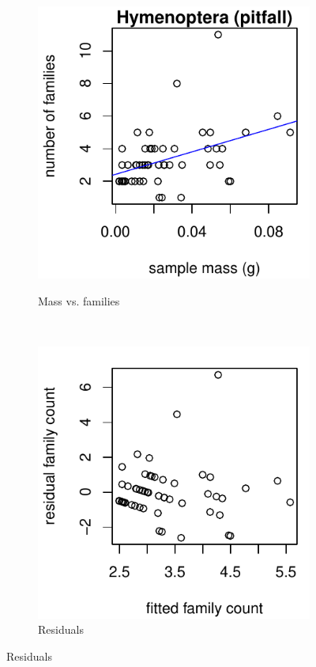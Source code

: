\documentclass[10pt,letterpaper,twocolumn]{article}
\begin{document}
\begin{figure}[h]
	\centering
	\begin{subfigure}[b]{0.15\textwidth}
		\caption{Mass vs. families}
		\includegraphics[width=\textwidth]{plots/mass-vs-count/scatter/2015_pitfall_Hymenoptera_mass-vs-count.pdf}
		\label{fig:pitfall_hymenoptera_scatter}
	\end{subfigure}
	~
	\begin{subfigure}[b]{0.15\textwidth}
		\caption{Residuals}
		\includegraphics[width=\textwidth]{plots/mass-vs-count/residual/2015_pitfall_Hymenoptera_residual.pdf}

\end{subfigure}
\end{figure}
\end{document}

